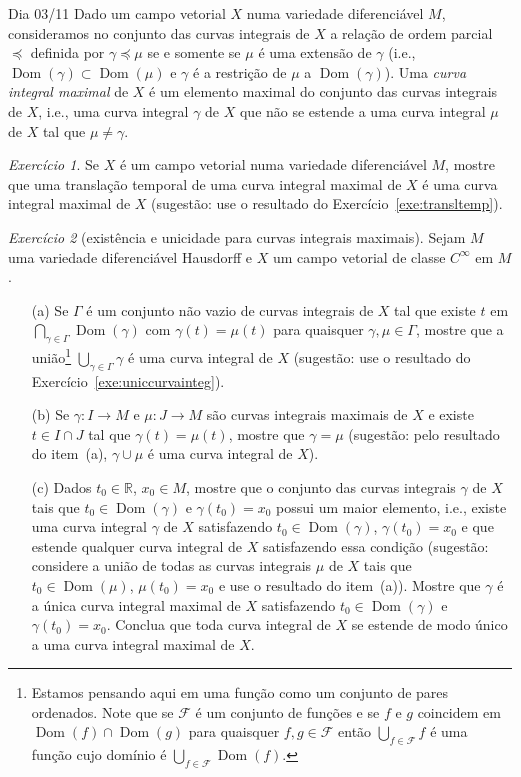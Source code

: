 \documentclass[oneside,11pt]{amsart}
\newcommand{\R}{\mathds R}
\DeclareMathOperator{\Dom}{Dom}
\theoremstyle{remark}\newtheorem{exercise}{Exercício}[section]
\theoremstyle{plain}\newtheorem{teo}{Teorema}[section]
\theoremstyle{plain}\newtheorem{lem}[teo]{Lema}
\theoremstyle{plain}\newtheorem{prop}[teo]{Proposição}
\theoremstyle{definition}\newtheorem{defin}[teo]{Definição}
\theoremstyle{remark}\newtheorem{rem}[teo]{Observação}
\theoremstyle{definition}\newtheorem{example}[teo]{Exemplo}
\numberwithin{equation}{section}
\begin{document}
\begin{section}{Dia 03/11}
Dado um campo vetorial $X$ numa variedade diferenciável $M$, consideramos no conjunto das curvas integrais de $X$ a relação
de ordem parcial $\preceq$ definida por $\gamma\preceq\mu$ se e somente se $\mu$ é uma extensão de $\gamma$ (i.e., $\Dom(\gamma)\subset\Dom(\mu)$
e $\gamma$ é a restrição de $\mu$ a $\Dom(\gamma)$). Uma {\em curva integral maximal\/} de $X$ é um elemento maximal do conjunto das curvas integrais
de $X$, i.e., uma curva integral $\gamma$ de $X$ que não se estende a uma curva integral $\mu$ de $X$ tal que $\mu\ne\gamma$.

\begin{exercise}\label{exe:translcurintmax}
Se $X$ é um campo vetorial numa variedade diferenciável $M$, mostre que uma translação temporal de uma curva integral maximal de $X$
é uma curva integral maximal de $X$ (sugestão: use o resultado do Exercício~\ref{exe:transltemp}).
\end{exercise}

\begin{exercise}[existência e unicidade para curvas integrais maximais]\label{exe:maxintcurve}
Sejam $M$ uma variedade diferenciável Hausdorff e $X$ um campo vetorial de classe $C^\infty$ em $M$.
\begin{itemize}
\item[(a)] Se $\Gamma$ é um conjunto não vazio de curvas integrais de $X$ tal que existe $t$ em $\bigcap_{\gamma\in\Gamma}\Dom(\gamma)$ com
$\gamma(t)=\mu(t)$ para quaisquer $\gamma,\mu\in\Gamma$, mostre que a união\footnote{%
Estamos pensando aqui em uma função como um conjunto de pares ordenados. Note que se $\mathcal F$ é um conjunto de funções e se $f$ e $g$ coincidem
em $\Dom(f)\cap\Dom(g)$ para quaisquer $f,g\in\mathcal F$ então $\bigcup_{f\in\mathcal F}f$ é uma função cujo domínio é $\bigcup_{f\in\mathcal F}\Dom(f)$.}
$\bigcup_{\gamma\in\Gamma}\gamma$ é uma curva integral de $X$ (sugestão: use o resultado do Exercício~\ref{exe:uniccurvainteg}).
\item[(b)] Se $\gamma:I\to M$ e $\mu:J\to M$ são curvas integrais maximais de $X$ e existe $t\in I\cap J$ tal que $\gamma(t)=\mu(t)$, mostre que
$\gamma=\mu$ (sugestão: pelo resultado do item~(a), $\gamma\cup\mu$ é uma curva integral de $X$).
\item[(c)] Dados $t_0\in\R$, $x_0\in M$, mostre que o conjunto das curvas integrais $\gamma$ de $X$ tais que $t_0\in\Dom(\gamma)$
e $\gamma(t_0)=x_0$ possui um maior elemento, i.e., existe uma curva integral $\gamma$ de $X$ satisfazendo $t_0\in\Dom(\gamma)$, $\gamma(t_0)=x_0$ e que estende
qualquer curva integral de $X$ satisfazendo essa condição (sugestão: considere a união de todas as curvas integrais $\mu$ de $X$ tais que $t_0\in\Dom(\mu)$,
$\mu(t_0)=x_0$ e use o resultado do item~(a)). Mostre que $\gamma$ é a única curva integral maximal de $X$ satisfazendo $t_0\in\Dom(\gamma)$ e $\gamma(t_0)=x_0$.
Conclua que toda curva integral de $X$ se estende de modo único a uma curva integral maximal de $X$.
\end{itemize}
\end{exercise}


\end{section}
\end{document}

